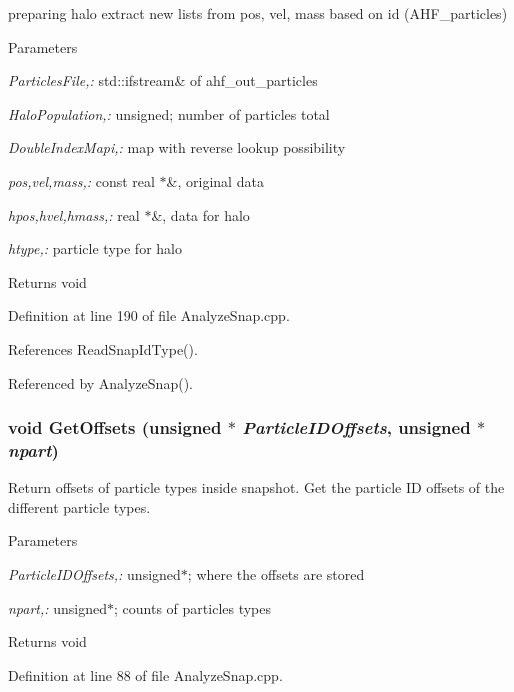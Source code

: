 preparing halo extract new lists from pos, vel, mass based on id (AHF\_\-particles) 


\begin{DoxyParams}{Parameters}
\item[{\em ParticlesFile,:}]std::ifstream\& of ahf\_\-out\_\-particles \item[{\em HaloPopulation,:}]unsigned; number of particles total \item[{\em DoubleIndexMapi,:}]map with reverse lookup possibility \item[{\em pos,vel,mass,:}]const real $\ast$\&, original data \item[{\em hpos,hvel,hmass,:}]real $\ast$\&, data for halo \item[{\em htype,:}]particle type for halo \end{DoxyParams}
\begin{DoxyReturn}{Returns}
void 
\end{DoxyReturn}


Definition at line 190 of file AnalyzeSnap.cpp.



References ReadSnapIdType().



Referenced by AnalyzeSnap().

\subsubsection[{GetOffsets}]{\setlength{\rightskip}{0pt plus 5cm}void GetOffsets (unsigned $\ast$ {\em ParticleIDOffsets}, \/  unsigned $\ast$ {\em npart})}\label{AnalyzeSnap_8cpp_afae3a184f26b7f4398f94e4927188291}


Return offsets of particle types inside snapshot. Get the particle ID offsets of the different particle types. 


\begin{DoxyParams}{Parameters}
\item[{\em ParticleIDOffsets,:}]unsigned$\ast$; where the offsets are stored \item[{\em npart,:}]unsigned$\ast$; counts of particles types \end{DoxyParams}
\begin{DoxyReturn}{Returns}
void 
\end{DoxyReturn}


Definition at line 88 of file AnalyzeSnap.cpp.



